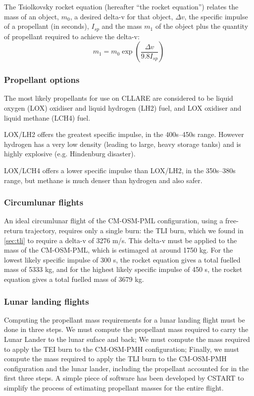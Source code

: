 \documentclass{report}
\begin{document}
The Tsiolkovsky rocket equation (hereafter ``the rocket equation'') relates the mass of an object, $m_0$, a desired delta-v for that object, $\Delta v$, the specific impulse of a propellant (in seconds), $I_{sp}$ and the mass $m_1$ of the object plus the quantity of propellant required to achieve the delta-v:
\begin{equation}
m_1 = m_0\exp \left( \frac{\Delta v}{9.8 I_{sp}} \right)
\end{equation}

\subsubsection{Propellant options}

The most likely propellants for use on CLLARE are considered to be liquid oxygen (LOX) oxidiser and liquid hydrogen (LH2) fuel, and LOX oxidiser and liquid methane (LCH4) fuel.

LOX/LH2 offers the greatest specific impulse, in the 400s--450s range.  However hydrogen has a very low density (leading to large, heavy storage tanks) and is highly explosive (e.g. Hindenburg disaster).

LOX/LCH4 offers a lower specific impulse than LOX/LH2, in the 350s--380s range, but methane is much denser than hydrogen and also safer.

\subsubsection{Circumlunar flights}

An ideal circumlunar flight of the CM-OSM-PML configuration, using a free-return trajectory, requires only a single burn: the TLI burn, which we found in \ref{sec:tli} to require a delta-v of 3276 m/s.  This delta-v must be applied to the mass of the CM-OSM-PML, which is estimaged at around 1750 kg.  For the lowest likely specific impulse of 300 s, the rocket equation gives a total fuelled mass of 5333 kg, and for the highest likely specific impulse of 450 s, the rocket equation gives a total fuelled mass of 3679 kg.

\subsubsection{Lunar landing flights}

Computing the propellant mass requirements for a lunar landing flight must be done in three steps.  We must compute the propellant mass required to carry the Lunar Lander to the lunar suface and back; We must compute the mass required to apply the TEI burn to the CM-OSM-PMH configuration; Finally, we must compute the mass required to apply the TLI burn to the CM-OSM-PMH configuration and the lunar lander, including the propellant accounted for in the first three steps.  A simple piece of software has been developed by CSTART to simplify the process of estimating propellant masses for the entire flight.
\end{document}
